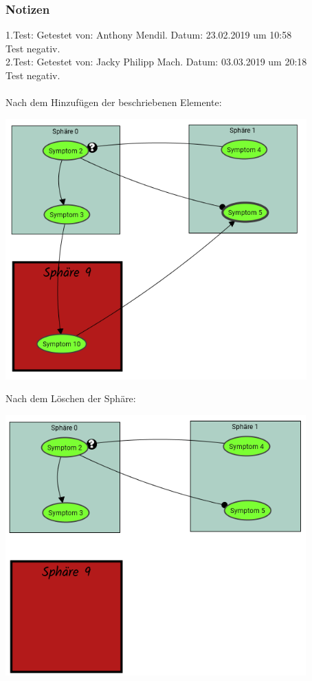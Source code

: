 \documentclass[enabledeprecatedfontcommands]{scrartcl}
\begin{document}
\subsubsection{Notizen}
1.Test: Getestet von: Anthony Mendil. Datum: 23.02.2019 um 10:58 \\
Test negativ. \\
2.Test: Getestet von: Jacky Philipp Mach. Datum: 03.03.2019 um 20:18 \\
Test negativ.\\ \\
Nach dem Hinzufügen der beschriebenen Elemente: 
\begin{center}
\includegraphics[height=10cm]{2_20korrektvorher.PNG}
\end{center}
\newpage
Nach dem Löschen der Sphäre: 
\begin{center}
\includegraphics[height=10cm]{2_20korrektnachher.PNG}
\end{center}
\end{document}
